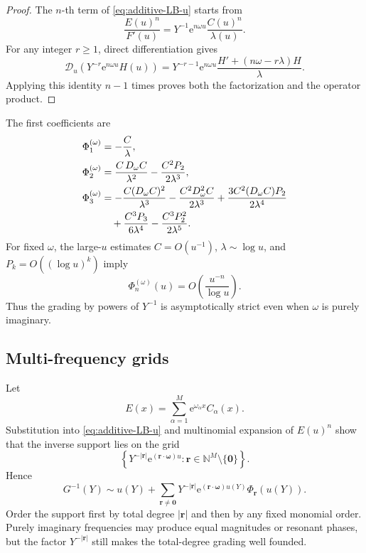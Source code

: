 \documentclass[11pt]{article}
\numberwithin{equation}{section}
\theoremstyle{mainthm}
\theoremstyle{defstyle}
\theoremstyle{remark}
\newcommand{\e}{\mathrm e}
\begin{document}
\begin{proof}
The \(n\)-th term of \cref{eq:additive-LB-u} starts from
\[
 \frac{E(u)^n}{F'(u)}
 =Y^{-1}\e^{n\omega u}\frac{C(u)^n}{\lambda(u)}.
\]
For any integer \(r\ge1\), direct differentiation gives
\begin{equation}\label{eq:operator-factor-step}
 \mathscr D_u\left(Y^{-r}\e^{n\omega u}H(u)\right)
 =Y^{-r-1}\e^{n\omega u}
 \frac{H'+(n\omega-r\lambda)H}{\lambda}.
\end{equation}
Applying this identity \(n-1\) times proves both the factorization and the operator product.
\end{proof}

The first coefficients are
\begin{align}
 \Phi_1^{(\omega)}
 &=-\frac{C}{\lambda},\label{eq:Phi1}\\
 \Phi_2^{(\omega)}
 &=\frac{C\,D_\omega C}{\lambda^2}
 -\frac{C^2P_2}{2\lambda^3},\label{eq:Phi2}\\
 \Phi_3^{(\omega)}
 &=-\frac{C(D_\omega C)^2}{\lambda^3}
 -\frac{C^2D_\omega^2C}{2\lambda^3}
 +\frac{3C^2(D_\omega C)P_2}{2\lambda^4}\notag\\
 &\quad
 +\frac{C^3P_3}{6\lambda^4}
 -\frac{C^3P_2^2}{2\lambda^5}.
 \label{eq:Phi3}
\end{align}
For fixed \(\omega\), the large-\(u\) estimates \(C=O(u^{-1})\), \(\lambda\sim\log u\), and \(P_k=O((\log u)^k)\) imply
\begin{equation}\label{eq:Phi-size}
 \Phi_n^{(\omega)}(u)=O\!\left(\frac{u^{-n}}{\log u}\right).
\end{equation}
Thus the grading by powers of \(Y^{-1}\) is asymptotically strict even when \(\omega\) is purely imaginary.

\subsection{Multi-frequency grids}

Let
\begin{equation}\label{eq:multi-E}
 E(x)=\sum_{\alpha=1}^{M}\e^{\omega_\alpha x}C_\alpha(x).
\end{equation}
Substitution into \cref{eq:additive-LB-u} and multinomial expansion of \(E(u)^n\) show that the inverse support lies on the grid
\begin{equation}\label{eq:multi-grid}
 \left\{
 Y^{-\lvert\bm r\rvert}\e^{(\bm r\cdot\bm\omega)u}:
 \bm r\in\mathbb N^M\setminus\{\bm0\}
 \right\}.
\end{equation}
Hence
\begin{equation}\label{eq:multi-transseries}
 G^{-1}(Y)
 \sim u(Y)+\sum_{\bm r\ne\bm0}
 Y^{-\lvert\bm r\rvert}\e^{(\bm r\cdot\bm\omega)u(Y)}
 \Phi_{\bm r}(u(Y)).
\end{equation}
Order the support first by total degree \(\lvert\bm r\rvert\) and then by any fixed monomial order.  Purely imaginary frequencies may produce equal magnitudes or resonant phases, but the factor \(Y^{-\lvert\bm r\rvert}\) still makes the total-degree grading well founded.
\end{document}
